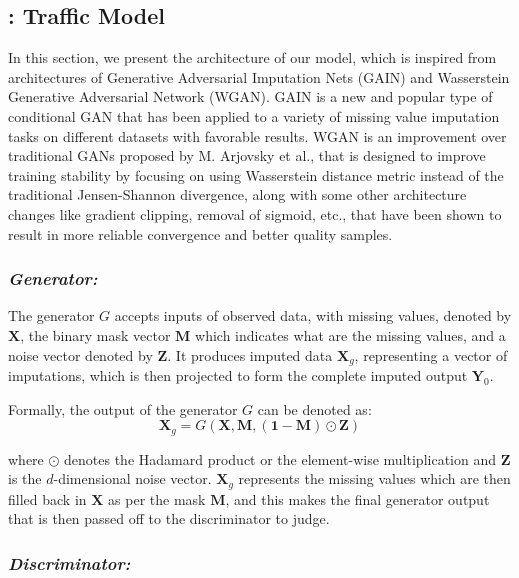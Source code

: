 \subsection{\name: Traffic Model}

In this section, we present the architecture of our \name model, which is inspired from architectures of Generative Adversarial Imputation Nets (GAIN)\cite{gain} and Wasserstein Generative Adversarial Network (WGAN)\cite{wgan}. GAIN is a new and popular type of conditional GAN that has been applied to a variety of missing value imputation tasks on different datasets with favorable results. WGAN is an improvement over traditional GANs proposed by M. Arjovsky et al., that is designed to improve training stability by focusing on using Wasserstein distance metric instead of the traditional Jensen-Shannon divergence, along with some other architecture changes like gradient clipping, removal of sigmoid, etc., that have been shown to result in more reliable convergence and better quality samples.

\subsubsection{\textit{Generator:}}

The generator \( G \) accepts inputs of observed data, with missing values, denoted by \( \mathbf{X} \), the binary mask vector \( \mathbf{M} \) which indicates what are the missing values, and a noise vector denoted by \( \mathbf{Z} \). It produces imputed data \( \mathbf{X}_g \), representing a vector of imputations, which is then projected to form the complete imputed output \( \mathbf{Y}_0 \). 

Formally, the output of the generator \( G \) can be denoted as: 
\[ \mathbf{X}_g = G(\mathbf{X}, \mathbf{M}, (\mathbf{1}-\mathbf{M}) \odot \mathbf{Z}) \]

where \( \odot \) denotes the Hadamard product or the element-wise multiplication and \( \mathbf{Z} \) is the \( d \)-dimensional noise vector. \( \mathbf{X}_g \) represents the missing values which are then filled back in \( \mathbf{X} \) as per the mask \( \mathbf{M} \), and this makes the final generator output that is then passed off to the discriminator to judge.

\subsubsection{\textit{Discriminator:}}

